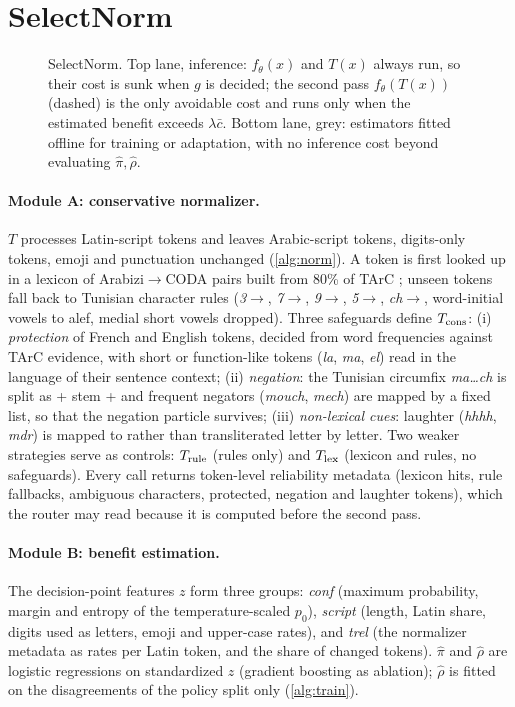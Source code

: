 \section{SelectNorm}
\label{sec:method}

\begin{figure}[t]
\centering

\caption{SelectNorm. Top lane, inference: $f_\theta(x)$ and $T(x)$ always run, so their cost is sunk when $g$ is decided; the second pass $f_\theta(T(x))$ (dashed) is the only avoidable cost and runs only when the estimated benefit exceeds $\lambda\bar c$. Bottom lane, grey: estimators fitted offline for training or adaptation, with no inference cost beyond evaluating $\hat\pi,\hat\rho$.}
\label{fig:arch}
\end{figure}

\paragraph{Module A: conservative normalizer.}
$T$ processes Latin-script tokens and leaves Arabic-script tokens, digits-only tokens, emoji and punctuation unchanged (\cref{alg:norm}).
A token is first looked up in a lexicon of Arabizi$\to$CODA pairs built from 80\% of TArC \citep{gugliotta2022tarc}; unseen tokens fall back to Tunisian character rules (\textit{3}$\to$, \textit{7}$\to$, \textit{9}$\to$, \textit{5}$\to$, \textit{ch}$\to$, word-initial vowels to alef, medial short vowels dropped).
Three safeguards define $T_{\rm cons}$:
(i) \emph{protection} of French and English tokens, decided from word frequencies against TArC evidence, with short or function-like tokens (\textit{la}, \textit{ma}, \textit{el}) read in the language of their sentence context;
(ii) \emph{negation}: the Tunisian circumfix \textit{ma\ldots ch} is split as  + stem +  and frequent negators (\textit{mouch}, \textit{mech}) are mapped by a fixed list, so that the negation particle survives;
(iii) \emph{non-lexical cues}: laughter (\textit{hhhh}, \textit{mdr}) is mapped to  rather than transliterated letter by letter.
Two weaker strategies serve as controls: $T_{\rm rule}$ (rules only) and $T_{\rm lex}$ (lexicon and rules, no safeguards).
Every call returns token-level reliability metadata (lexicon hits, rule fallbacks, ambiguous characters, protected, negation and laughter tokens), which the router may read because it is computed before the second pass.

\paragraph{Module B: benefit estimation.}
The decision-point features $z$ form three groups:
\emph{conf} (maximum probability, margin and entropy of the temperature-scaled $p_0$),
\emph{script} (length, Latin share, digits used as letters, emoji and upper-case rates),
and \emph{trel} (the normalizer metadata as rates per Latin token, and the share of changed tokens).
$\hat\pi$ and $\hat\rho$ are logistic regressions on standardized $z$ (gradient boosting as ablation); $\hat\rho$ is fitted on the disagreements of the policy split only (\cref{alg:train}).

